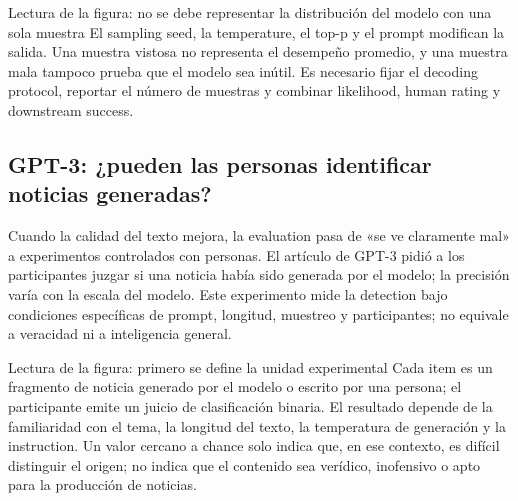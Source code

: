 
\begin{knowledgebox}{Lectura de la figura: no se debe representar la distribución del modelo con una sola muestra}
El sampling seed, la temperature, el top-p y el prompt modifican la salida. Una muestra vistosa no representa el desempeño promedio, y una muestra mala tampoco prueba que el modelo sea inútil. Es necesario fijar el decoding protocol, reportar el número de muestras y combinar likelihood, human rating y downstream success.
\end{knowledgebox}

\subsection{GPT-3: ¿pueden las personas identificar noticias generadas?}

Cuando la calidad del texto mejora, la evaluation pasa de «se ve claramente mal» a experimentos controlados con personas. El artículo de GPT-3 pidió a los participantes juzgar si una noticia había sido generada por el modelo; la precisión varía con la escala del modelo. Este experimento mide la detection bajo condiciones específicas de prompt, longitud, muestreo y participantes; no equivale a veracidad ni a inteligencia general.


\begin{knowledgebox}{Lectura de la figura: primero se define la unidad experimental}
Cada item es un fragmento de noticia generado por el modelo o escrito por una persona; el participante emite un juicio de clasificación binaria. El resultado depende de la familiaridad con el tema, la longitud del texto, la temperatura de generación y la instruction. Un valor cercano a chance solo indica que, en ese contexto, es difícil distinguir el origen; no indica que el contenido sea verídico, inofensivo o apto para la producción de noticias.
\end{knowledgebox}



